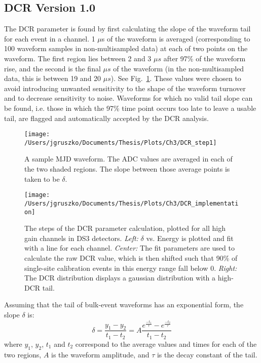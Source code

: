 \subsection{DCR Version 1.0}
The DCR parameter is found by first calculating the slope of the waveform tail for each event in a channel. 1 $\mu$s of the waveform is averaged (corresponding to 100 waveform samples in non-multisampled data) at each of two points on the waveform. The first region lies between 2 and 3 $\mu s$ after 97\% of the waveform rise, and the second is the final $\mu s$ of the waveform (in the non-multisampled data, this is between 19 and 20 $\mu s$). See Fig.~\ref{fig:DCR_step1}. These values were chosen to avoid introducing unwanted sensitivity to the shape of the waveform turnover and to decrease sensitivity to noise. Waveforms for which no valid tail slope can be found, i.e. those in which the 97\% time point occurs too late to leave a usable tail, are flagged and automatically accepted by the DCR analysis. 

\begin{figure}[h]
 \centering
 \texttt{[image: /Users/jgruszko/Documents/Thesis/Plots/Ch3/DCR\_step1]}
 \caption[A sample MJD waveform, with indicated tail slope measurement points]{A sample MJD waveform. The ADC values are averaged in each of the two shaded regions. The slope between those average points is taken to be $\delta$.} 
 \label{fig:DCR_step1}
\end{figure}

\begin{figure*}[t]
 \centering
 \texttt{[image: /Users/jgruszko/Documents/Thesis/Plots/Ch3/DCR\_implementation]}
 \caption[The steps of the DCR parameter calculation]{The steps of the DCR parameter calculation, plotted for all high gain channels in DS3 detectors. {\it Left:} $\delta$ vs. Energy is plotted and fit with a line for each channel. {\it Center:} The fit parameters are used to calculate the raw DCR value, which is then shifted such that 90\% of single-site calibration events in this energy range fall below 0. {\it Right:} The DCR distribution displays a gaussian distribution with a high-DCR tail.} 
 \label{fig:DCR_implementation}
\end{figure*}

Assuming that the tail of bulk-event waveforms has an exponential form, the slope $\delta$ is:
$$\delta = \frac{y_1 - y_2}{t_1-t_2} = A\frac{e^{\frac{-t_1}{\tau}}-e^{\frac{-t_2}{\tau}}}{t_1-t_2} $$
where $y_1$, $y_2$, $t_1$ and $t_2$ correspond to the average values and times for each of the two regions, $A$ is the waveform amplitude, and $\tau$ is the decay constant of the tail. 

